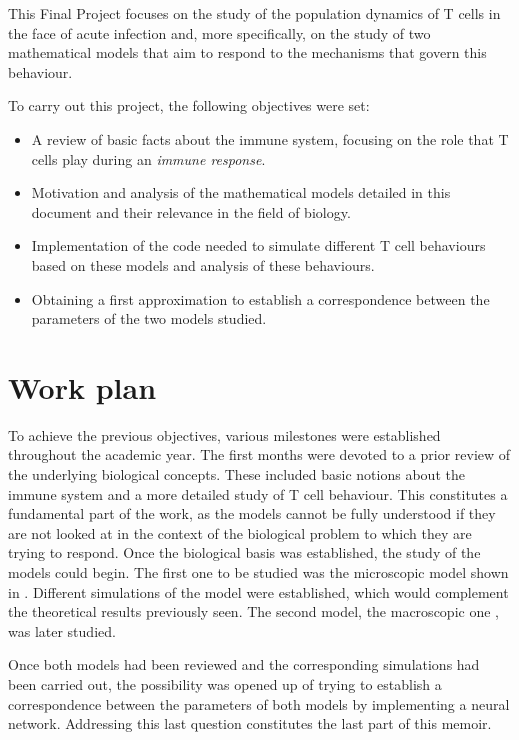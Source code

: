 This Final Project focuses on the study of the population dynamics of T cells in the face of acute infection and, more specifically, on the study of two mathematical models that aim to respond to the mechanisms that govern this behaviour.

To carry out this project, the following objectives were set:

\begin{itemize}
	
	\item A review of basic facts about the immune system, focusing on the role that T cells play during an \textit{immune response}.
	
	\item Motivation and analysis of the mathematical models detailed in this document and their relevance in the field of biology.
	
	\item Implementation of the code needed to simulate different T cell behaviours based on these models and analysis of these behaviours. 
	
	\item Obtaining a first approximation to establish a correspondence between the parameters of the two models studied. 
\end{itemize}

\section{Work plan}

To achieve the previous objectives, various milestones were established throughout the academic year. The first months were devoted to a prior review of the underlying biological concepts. These included basic notions about the immune system and a more detailed study of T cell behaviour. This constitutes a fundamental part of the work, as the models cannot be fully understood if they are not looked at in the context of the biological problem to which they are trying to respond. Once the biological basis was established, the study of the models could begin. The first one to be studied was the microscopic model shown in \cite{JTB}. Different simulations of the model were established, which would complement the theoretical results previously seen. The second model, the macroscopic one \citep{arias2015growth}, was later studied.

Once both models had been reviewed and the corresponding simulations had been carried out, the possibility was opened up of trying to establish a correspondence between the parameters of both models by implementing a neural network. Addressing this last question constitutes the last part of this memoir.



